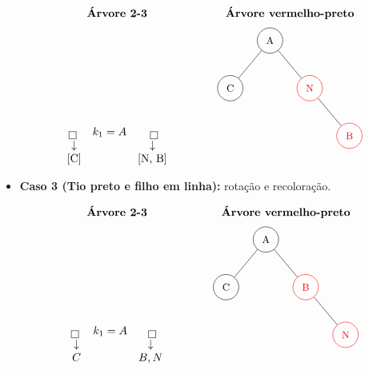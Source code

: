 \begin{itemize}
\medskip

\begin{center}
\renewcommand{\arraystretch}{1.5}
\[
\begin{array}{ccc}
\textbf{Árvore 2-3} & & \textbf{Árvore vermelho-preto} \\[6pt]

\begin{array}{ccc}
  \boxed{} \;     & k_1 = A & \; \boxed{} \\
  \downarrow      &         &   \downarrow   \\
  \text{[C]}      &         & \text{[N, B]} \\
\end{array}
&\qquad&
\begin{tikzpicture}[
  every node/.style={draw, circle, minimum size=8mm, inner sep=0pt, font=\small},
  level distance=1.5cm, sibling distance=2.5cm
]
\tikzset{
  preto/.style={draw=black},
  vermelho/.style={draw=red, text=red}
}
\node[preto] {A}
  child { node[preto] {C} }
  child {
    node[vermelho] {N}
      child[missing]
      child { node[vermelho] {B} } %
  };
\end{tikzpicture}
\end{array}
\]
\end{center}


\item \textbf{Caso 3 (Tio preto e filho em linha):} rotação e recoloração.

\begin{center}
\renewcommand{\arraystretch}{1.5}
\[
\begin{array}{ccc}
\textbf{Árvore 2-3} & & \textbf{Árvore vermelho-preto} \\[6pt]

\begin{array}{ccc}
  \boxed{} \; & k_1 = A & \; \boxed{}  \\
  \downarrow  &         &   \downarrow \\
  C           &         & B, N         \\
\end{array}
&\qquad&
\begin{tikzpicture}[
  every node/.style={draw, circle, minimum size=8mm, inner sep=0pt, font=\small},
  level distance=1.5cm, sibling distance=2.5cm
]
\tikzset{
  preto/.style={draw=black},
  vermelho/.style={draw=red, text=red}
}
\node[preto] {A}
  child { node[preto] {C} }
  child {
    node[vermelho] {B}
      child[missing]
      child { node[vermelho] {N} } %
  };
\end{tikzpicture}
\end{array}
\]
\end{center}


\end{itemize}
